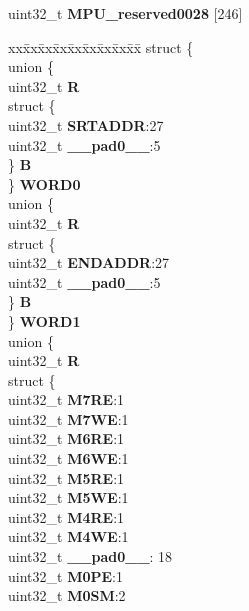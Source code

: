 \begin{DoxyCompactItemize}
\begin{tabbing}
\end{tabbing}\item 
\mbox{\label{structMPU__tag_a652f4964191d1d2c8dfe0047a3bc0daa}} 
uint32\+\_\+t {\bfseries M\+P\+U\+\_\+reserved0028} \mbox{[}246\mbox{]}
\item 
\mbox{\label{structMPU__tag_a646ce140c228aea7bc795281ac3cafce}} 
\begin{tabbing}
xx\=xx\=xx\=xx\=xx\=xx\=xx\=xx\=xx\=\kill
struct \{\\
\>union \{\\
\>\>uint32\_t {\bfseries R}\\
\>\>struct \{\\
\>\>\>uint32\_t {\bfseries SRTADDR}:27\\
\>\>\>uint32\_t {\bfseries \_\_pad0\_\_}:5\\
\>\>\} {\bfseries B}\\
\>\} {\bfseries WORD0}\\
\>union \{\\
\>\>uint32\_t {\bfseries R}\\
\>\>struct \{\\
\>\>\>uint32\_t {\bfseries ENDADDR}:27\\
\>\>\>uint32\_t {\bfseries \_\_pad0\_\_}:5\\
\>\>\} {\bfseries B}\\
\>\} {\bfseries WORD1}\\
\>union \{\\
\>\>uint32\_t {\bfseries R}\\
\>\>struct \{\\
\>\>\>uint32\_t {\bfseries M7RE}:1\\
\>\>\>uint32\_t {\bfseries M7WE}:1\\
\>\>\>uint32\_t {\bfseries M6RE}:1\\
\>\>\>uint32\_t {\bfseries M6WE}:1\\
\>\>\>uint32\_t {\bfseries M5RE}:1\\
\>\>\>uint32\_t {\bfseries M5WE}:1\\
\>\>\>uint32\_t {\bfseries M4RE}:1\\
\>\>\>uint32\_t {\bfseries M4WE}:1\\
\>\>\>uint32\_t {\bfseries \_\_pad0\_\_}: 18\\
\>\>\>uint32\_t {\bfseries M0PE}:1\\
\>\>\>uint32\_t {\bfseries M0SM}:2\\

\end{tabbing}
\end{DoxyCompactItemize}
